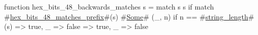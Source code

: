 function hex_bits_48_backwards_matches s = match s {
  s if match #\hyperref[sailRISCVzhexzybitszy48zymatcheszyprefix]{hex\_bits\_48\_matches\_prefix}#(s) {
    #\hyperref[sailRISCVzSome]{Some}# (_, n) if n == #\hyperref[sailRISCVzstringzylength]{string\_length}#(s) => true,
    _ => false
  } => true,
  _ => false
}
